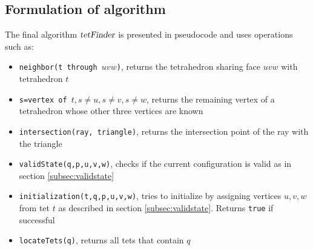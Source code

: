 \documentclass[../thesis.tex]{subfiles}
\begin{document}
\subsection{Formulation of algorithm}\label{subsec:tetfinder}
The final algorithm $\textsl{tetFinder}$ is presented in pseudocode and uses operations such as:
\begin{itemize}
  \item \texttt{neighbor(t through $uvw$)}, returns the tetrahedron sharing face $uvw$ with tetrahedron $t$
  \item \texttt{s=vertex of $t, s \neq u, s \neq v, s \neq w$}, returns the remaining vertex of a tetrahedron whose other three
  vertices are known
  \item \texttt{intersection(ray, triangle)}, returns the intersection point of the ray with the triangle %
  \item \texttt{validState(q,p,u,v,w)}, checks if the current configuration is valid as in section \ref{subsec:validstate}
  \item \texttt{initialization(t,q,p,u,v,w)}, tries to initialize by assigning vertices $u,v,w$ from tet $t$ as described in section \ref{subsec:validstate}. Returns \texttt{true} if successful
  \item \texttt{locateTets(q)}, returns all tets that contain $q$
\end{itemize}
\end{document}
